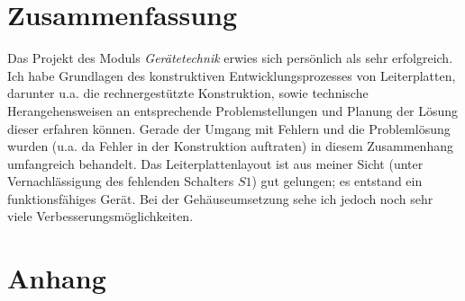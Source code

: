 \documentclass[a4paper, 12pt]{article}
\begin{document}
\section{Zusammenfassung}
Das Projekt des Moduls \emph{Gerätetechnik} erwies sich persönlich als sehr erfolgreich. Ich habe Grundlagen des konstruktiven Entwicklungsprozesses von Leiterplatten, darunter u.a. die rechnergestützte Konstruktion, sowie technische Herangehensweisen an entsprechende Problemstellungen und Planung der Lösung dieser erfahren können. Gerade der Umgang mit Fehlern und die Problemlösung wurden (u.a. da Fehler in der Konstruktion auftraten) in diesem Zusammenhang umfangreich behandelt. Das Leiterplattenlayout ist aus meiner Sicht (unter Vernachlässigung des fehlenden Schalters $S1$) gut gelungen; es entstand ein funktionsfähiges Gerät. Bei der Gehäuseumsetzung sehe ich jedoch noch sehr viele Verbesserungsmöglichkeiten.

\appendix
\section{Anhang}


%











%
\end{document}
